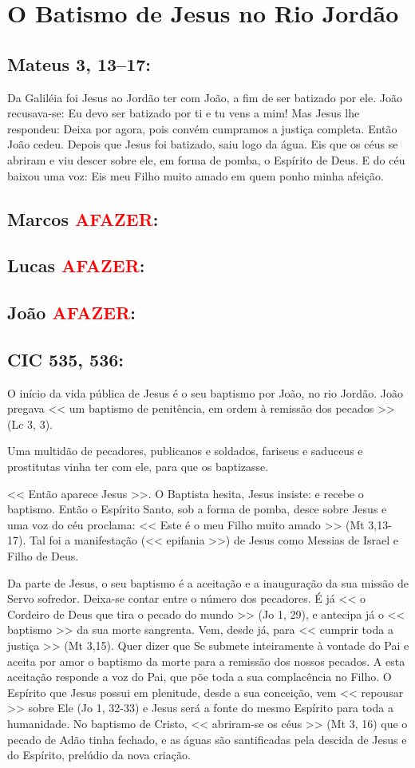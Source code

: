 \documentclass[10pt,a5paper]{book}
\newcommand{\from}[1]{\subsection*{#1}}
\newcommand{\TODO}{\textcolor{red}{\ttfamily AFAZER}}
\begin{document}

\section{O Batismo de Jesus no Rio Jordão}

\from{Mateus 3, 13--17:}

Da Galiléia foi Jesus ao Jordão ter com João, a fim de ser batizado por ele.
João recusava-se: Eu devo ser batizado por ti e tu vens a mim!
Mas Jesus lhe respondeu:
Deixa por agora, pois convém cumpramos a justiça completa.
Então João cedeu.
Depois que Jesus foi batizado, saiu logo da água.
Eis que os céus se abriram e viu descer sobre ele, em forma de pomba, o Espírito de Deus.
E do céu baixou uma voz:
Eis meu Filho muito amado em quem ponho minha afeição.

\from{Marcos \TODO:}

\from{Lucas \TODO:}

\from{João \TODO:}

\from{CIC 535, 536:}

O início da vida pública de Jesus é o seu baptismo por João, no rio Jordão.
João pregava << um baptismo de penitência, em ordem à remissão dos pecados >> (Lc 3, 3).

Uma multidão de pecadores, publicanos e soldados, fariseus e saduceus e prostitutas vinha ter com ele, para que os baptizasse.

<< Então aparece Jesus >>.
O Baptista hesita, Jesus insiste:
e recebe o baptismo.
Então o Espírito Santo, sob a forma de pomba, desce sobre Jesus e uma voz do céu proclama:
<< Este é o meu Filho muito amado >> (Mt 3,13-17).
Tal foi a manifestação (<< epifania >>) de Jesus como Messias de Israel e Filho de Deus.

Da parte de Jesus, o seu baptismo é a aceitação e a inauguração da sua missão de Servo sofredor.
Deixa-se contar entre o número dos pecadores.
É já << o Cordeiro de Deus que tira o pecado do mundo >> (Jo 1, 29), e antecipa já o << baptismo >> da sua morte sangrenta.
Vem, desde já, para << cumprir toda a justiça >> (Mt 3,15).
Quer dizer que Se submete inteiramente à vontade do Pai e aceita por amor o baptismo da morte para a remissão dos nossos pecados.
A esta aceitação responde a voz do Pai, que põe toda a sua complacência no Filho.
O Espírito que Jesus possui em plenitude, desde a sua conceição, vem << repousar >> sobre Ele (Jo 1, 32-33) e Jesus será a fonte do mesmo Espírito para toda a humanidade.
No baptismo de Cristo, << abriram-se os céus >> (Mt 3, 16) que o pecado de Adão tinha fechado, e as águas são santificadas pela descida de Jesus e do Espírito, prelúdio da nova criação.
\end{document}
